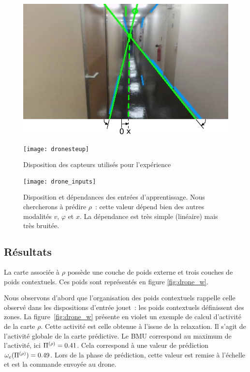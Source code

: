 \documentclass[../main]{subfiles}
\begin{document}
\begin{figure}
	\begin{minipage}{0.5\textwidth}
	\includegraphics[width=\textwidth]{visudrone.pdf}
	\end{minipage}
	\begin{minipage}{0.5\textwidth}
	\texttt{[image: dronesteup]}
	\end{minipage}
	\caption{Disposition des capteurs utilisés pour l'expérience}
	\label{fig:drone}
	\end{figure}

\begin{figure}
	\centering\texttt{[image: drone\_inputs]}
	\caption{Disposition et dépendances des entrées d'apprentissage. Nous chercherons à prédire $\rho$~: cette valeur dépend bien des autres modalités $v$, $\varphi$ et $x$. La dépendance est très simple (linéaire) mais très bruitée. \label{fig:drone_inp}}
\end{figure}


\subsection{Résultats}

La carte associée à $\rho$ possède une couche de poids externe et trois couches de poids contextuels. 
Ces poids sont représentés en figure \ref{fig:drone_w}. 

Nous observons d'abord que l'organisation des poids contextuels rappelle celle observé dans les dispositions d'entrée jouet~: les poids contextuels définissent des zones. 
La figure~\ref{fig:drone_w} présente en violet un exemple de calcul d'activité de la carte $\rho$. Cette activité est celle obtenue à l'issue de la relaxation. Il s'agit de l'activité globale de la carte prédictive.
Le BMU correspond au maximum de l'activité, ici $\Pi^{({\rho})} = 0.41$.
Cela correspond à une valeur de prédiction $\omega_e(\Pi^{({\rho})}) = 0.49$. 
Lors de la phase de prédiction, cette valeur est remise à l'échelle et est la commande envoyée au drone.
\end{document}
